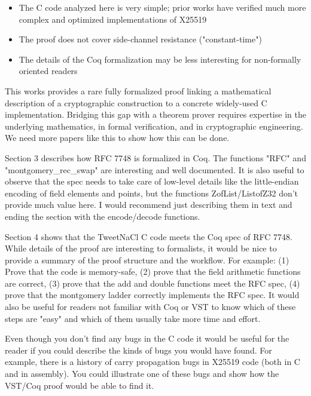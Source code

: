 \begin{center}
\end{center}

\begin{itemize}
    \item The C code analyzed here is very simple; prior works have verified much more complex and optimized implementations of X25519
    \item The proof does not cover side-channel resistance ("constant-time")
    \item The details of the Coq formalization may be less interesting for non-formally oriented readers
\end{itemize}

\begin{center}
\end{center}
This works provides a rare fully formalized proof linking a mathematical description of a cryptographic construction to a concrete widely-used C implementation. Bridging this gap with a theorem prover requires expertise in the underlying mathematics, in formal verification, and in cryptographic engineering. We need more papers like this to show how this can be done.

Section 3 describes how RFC 7748 is formalized in Coq. The functions "RFC" and "montgomery\_rec\_swap" are interesting and well documented. It is also useful to observe that the spec needs to take care of low-level details like the little-endian encoding of field elements and points, but the functions ZofList/ListofZ32 don't provide much value here. I would recommend just describing them in text and ending the section with the encode/decode functions.

Section 4 shows that the TweetNaCl C code meets the Coq spec of RFC 7748. While details of the proof are interesting to formalists, it would be nice to provide a summary of the proof structure and the workflow. For example: (1) Prove that the code is memory-safe, (2) prove that the field arithmetic functions are correct, (3) prove that the add and double functions meet the RFC spec, (4) prove that the montgomery ladder correctly implements the RFC spec. It would also be useful for readers not familiar with Coq or VST to know which of these steps are "easy" and which of them usually take more time and effort.

Even though you don't find any bugs in the C code it would be useful for the reader if you could describe the kinds of bugs you would have found. For example, there is a history of carry propagation bugs in X25519 code (both in C and in assembly). You could illustrate one of these bugs and show how the VST/Coq proof would be able to find it.

